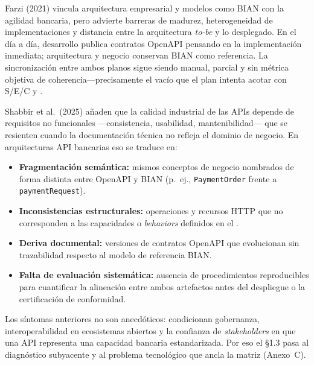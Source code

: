 Farzi (2021) vincula arquitectura empresarial y modelos como BIAN con la agilidad bancaria, pero
advierte barreras de madurez, heterogeneidad de implementaciones y distancia entre la arquitectura
\textit{to-be} y lo desplegado. En el día a día, desarrollo publica contratos OpenAPI pensando en
la implementación inmediata; arquitectura y negocio conservan BIAN como referencia. La
sincronización entre ambos planos sigue siendo manual, parcial y sin métrica objetiva de
coherencia---precisamente el vacío que el plan intenta acotar con S/E/C y \AlignmentScore{}.

Shabbir et al.\ (2025) añaden que la calidad industrial de las APIs depende de requisitos no
funcionales ---consistencia, usabilidad, mantenibilidad--- que se resienten cuando la documentación
técnica no refleja el dominio de negocio. En arquitecturas API bancarias eso se traduce en:

\begin{itemize}
  \item \textbf{Fragmentación semántica:} mismos conceptos de negocio nombrados de forma distinta
        entre OpenAPI y BIAN (p.\ ej., \texttt{PaymentOrder} frente a \texttt{paymentRequest}).
  \item \textbf{Inconsistencias estructurales:} operaciones y recursos HTTP que no corresponden a
        las capacidades o \textit{behaviors} definidos en el \ServiceDomain{}.
  \item \textbf{Deriva documental:} versiones de contratos OpenAPI que evolucionan sin trazabilidad
        respecto al modelo de referencia BIAN.
  \item \textbf{Falta de evaluación sistemática:} ausencia de procedimientos reproducibles para
        cuantificar la alineación entre ambos artefactos antes del despliegue o la certificación de
        conformidad.
\end{itemize}

Los síntomas anteriores no son anecdóticos: condicionan gobernanza, interoperabilidad en ecosistemas
abiertos y la confianza de \textit{stakeholders} en que una API representa una capacidad bancaria
estandarizada. Por eso el §1.3 pasa al diagnóstico subyacente y al problema tecnológico que ancla
la matriz (Anexo~C).
